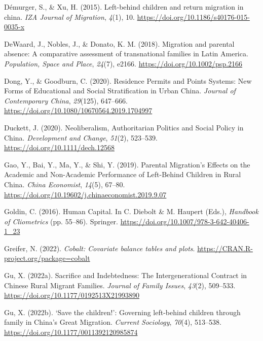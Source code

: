 \documentclass[
  man,floatsintext]{apa7}
\newlength{\cslhangindent}
\newlength{\cslentryspacingunit} %
\newenvironment{CSLReferences}[2] %
 {%
  \setlength{\parindent}{0pt}
  \ifodd #1
  \let\oldpar\par
  \def\par{\hangindent=\cslhangindent\oldpar}
  \fi
  \setlength{\parskip}{#2\cslentryspacingunit}
 }%
 {}
\begin{document}
\begin{CSLReferences}{1}{0}
\leavevmode{}%
Démurger, S., \& Xu, H. (2015). Left-behind children and return migration in china. \emph{IZA Journal of Migration}, \emph{4}(1), 10. \url{https://doi.org/10.1186/s40176-015-0035-x}

\leavevmode{}%
DeWaard, J., Nobles, J., \& Donato, K. M. (2018). Migration and parental absence: A comparative assessment of transnational families in Latin America. \emph{Population, Space and Place}, \emph{24}(7), e2166. \url{https://doi.org/10.1002/psp.2166}

\leavevmode{}%
Dong, Y., \& Goodburn, C. (2020). Residence Permits and Points Systems: New Forms of Educational and Social Stratification in Urban China. \emph{Journal of Contemporary China}, \emph{29}(125), 647--666. \url{https://doi.org/10.1080/10670564.2019.1704997}

\leavevmode{}%
Duckett, J. (2020). Neoliberalism, Authoritarian Politics and Social Policy in China. \emph{Development and Change}, \emph{51}(2), 523--539. \url{https://doi.org/10.1111/dech.12568}

\leavevmode{}%
Gao, Y., Bai, Y., Ma, Y., \& Shi, Y. (2019). Parental Migration{'}s Effects on the Academic and Non-Academic Performance of Left-Behind Children in Rural China. \emph{China Economist}, \emph{14}(5), 67--80. \url{https://doi.org/10.19602/j.chinaeconomist.2019.9.07}

\leavevmode{}%
Goldin, C. (2016). Human Capital. In C. Diebolt \& M. Haupert (Eds.), \emph{Handbook of Cliometrics} (pp. 55--86). Springer. \url{https://doi.org/10.1007/978-3-642-40406-1_23}

\leavevmode{}%
Greifer, N. (2022). \emph{Cobalt: Covariate balance tables and plots}. \url{https://CRAN.R-project.org/package=cobalt}

\leavevmode{}%
Gu, X. (2022a). Sacrifice and Indebtedness: The Intergenerational Contract in Chinese Rural Migrant Families. \emph{Journal of Family Issues}, \emph{43}(2), 509--533. \url{https://doi.org/10.1177/0192513X21993890}

\leavevmode{}%
Gu, X. (2022b). {`}Save the children!{'}: Governing left-behind children through family in China{'}s Great Migration. \emph{Current Sociology}, \emph{70}(4), 513--538. \url{https://doi.org/10.1177/0011392120985874}


\end{CSLReferences}
\end{document}

